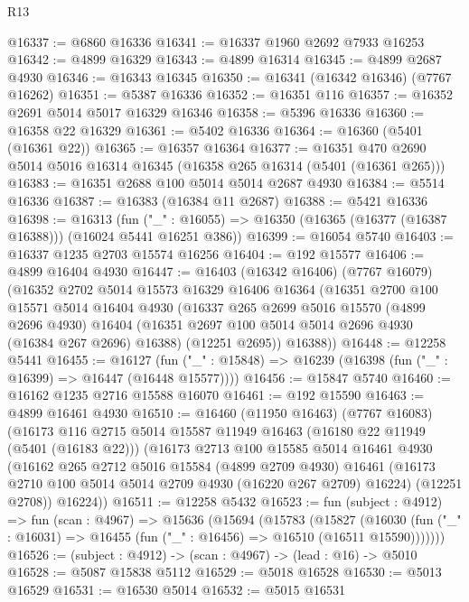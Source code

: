\begin{lexlean}{R13}
\begin{coremodule}
@16337 := @6860 @16336
@16341 := @16337 @1960 @2692 @7933 @16253
@16342 := @4899 @16329
@16343 := @4899 @16314
@16345 := @4899 @2687 @4930
@16346 := @16343 @16345
@16350 := @16341 (@16342 @16346) (@7767 @16262)
@16351 := @5387 @16336
@16352 := @16351 @116
@16357 := @16352 @2691 @5014 @5017 @16329 @16346
@16358 := @5396 @16336
@16360 := @16358 @22 @16329
@16361 := @5402 @16336
@16364 := @16360 (@5401 (@16361 @22))
@16365 := @16357 @16364
@16377 := @16351 @470 @2690 @5014 @5016 @16314 @16345 (@16358 @265 @16314 (@5401 (@16361 @265)))
@16383 := @16351 @2688 @100 @5014 @5014 @2687 @4930
@16384 := @5514 @16336
@16387 := @16383 (@16384 @11 @2687)
@16388 := @5421 @16336
@16398 := @16313
    (fun ("_" : @16055) => @16350 (@16365 (@16377 (@16387 @16388))) (@16024 @5441 @16251 @386))
@16399 := @16054 @5740
@16403 := @16337 @1235 @2703 @15574 @16256
@16404 := @192 @15577
@16406 := @4899 @16404 @4930
@16447 := @16403
    (@16342 @16406)
    (@7767 @16079)
    (@16352
      @2702
      @5014
      @15573
      @16329
      @16406
      @16364
      (@16351
        @2700
        @100
        @15571
        @5014
        @16404
        @4930
        (@16337
          @265
          @2699
          @5016
          @15570
          (@4899 @2696 @4930)
          @16404
          (@16351 @2697 @100 @5014 @5014 @2696 @4930 (@16384 @267 @2696) @16388)
          (@12251 @2695))
        @16388))
@16448 := @12258 @5441
@16455 := @16127
    (fun ("_" : @15848) => @16239 (@16398 (fun ("_" : @16399) => @16447 (@16448 @15577))))
@16456 := @15847 @5740
@16460 := @16162 @1235 @2716 @15588 @16070
@16461 := @192 @15590
@16463 := @4899 @16461 @4930
@16510 := @16460
    (@11950 @16463)
    (@7767 @16083)
    (@16173
      @116
      @2715
      @5014
      @15587
      @11949
      @16463
      (@16180 @22 @11949 (@5401 (@16183 @22)))
      (@16173
        @2713
        @100
        @15585
        @5014
        @16461
        @4930
        (@16162
          @265
          @2712
          @5016
          @15584
          (@4899 @2709 @4930)
          @16461
          (@16173 @2710 @100 @5014 @5014 @2709 @4930 (@16220 @267 @2709) @16224)
          (@12251 @2708))
        @16224))
@16511 := @12258 @5432
@16523 := fun (subject : @4912) =>
  fun (scan : @4967) =>
  @15636
    (@15694
      (@15783
        (@15827
          (@16030 (fun ("_" : @16031) => @16455 (fun ("_" : @16456) => @16510 (@16511 @15590)))))))
@16526 := (subject : @4912) -> (scan : @4967) -> (lead : @16) -> @5010
@16528 := @5087 @15838 @5112
@16529 := @5018 @16528
@16530 := @5013 @16529
@16531 := @16530 @5014
@16532 := @5015 @16531

\end{coremodule}
\end{lexlean}
